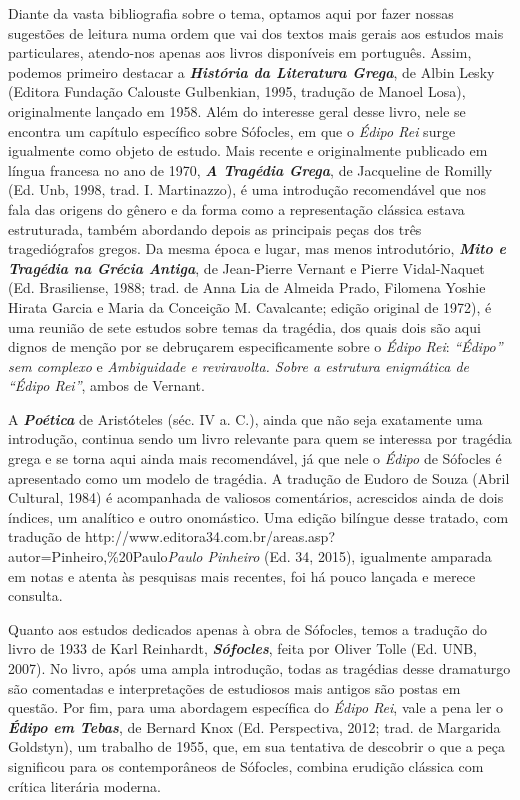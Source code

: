 Diante da vasta bibliografia sobre o tema, optamos aqui por fazer nossas
sugestões de leitura numa ordem que vai dos textos mais gerais aos
estudos mais particulares, atendo-nos apenas aos livros disponíveis em
português. Assim, podemos primeiro destacar a \emph{\textbf{História da
Literatura Grega}}, de Albin Lesky (Editora Fundação Calouste
Gulbenkian, 1995, tradução de Manoel Losa), originalmente lançado em
1958. Além do interesse geral desse livro, nele se encontra um capítulo
específico sobre Sófocles, em que o \emph{Édipo Rei} surge igualmente
como objeto de estudo. Mais recente e originalmente publicado em língua
francesa no ano de 1970, \emph{\textbf{A Tragédia Grega}}, de Jacqueline
de Romilly (Ed. Unb, 1998, trad. I. Martinazzo), é uma introdução
recomendável que nos fala das origens do gênero e da forma como a
representação clássica estava estruturada, também abordando depois as
principais peças dos três tragediógrafos gregos. Da mesma época e lugar,
mas menos introdutório, \emph{\textbf{Mito e Tragédia na Grécia
Antiga}}, de Jean-Pierre Vernant e Pierre Vidal-Naquet (Ed. Brasiliense,
1988; trad. de Anna Lia de Almeida Prado, Filomena Yoshie Hirata Garcia
e Maria da Conceição M. Cavalcante; edição original de 1972), é uma
reunião de sete estudos sobre temas da tragédia, dos quais dois são aqui
dignos de menção por se debruçarem especificamente sobre o \emph{Édipo
Rei}: \emph{``Édipo'' sem complexo} e \emph{Ambiguidade e reviravolta.
Sobre a estrutura enigmática de ``Édipo Rei''}, ambos de Vernant.

A \emph{\textbf{Poética}} de Aristóteles (séc. IV a. C.), ainda que não
seja exatamente uma introdução, continua sendo um livro relevante para
quem se interessa por tragédia grega e se torna aqui ainda mais
recomendável, já que nele o \emph{Édipo} de Sófocles é apresentado como
um modelo de tragédia. A tradução de Eudoro de Souza (Abril Cultural,
1984) é acompanhada de valiosos comentários, acrescidos ainda de dois
índices, um analítico e outro onomástico. Uma edição bilíngue desse
tratado, com tradução
de {http://www.editora34.com.br/areas.asp?autor=Pinheiro,\%20Paulo}{\emph{Paulo
Pinheiro}} (Ed. 34, 2015), igualmente amparada em notas e atenta às
pesquisas mais recentes, foi há pouco lançada e merece consulta.

Quanto aos estudos dedicados apenas à obra de Sófocles, temos a tradução
do livro de 1933 de Karl Reinhardt, \emph{\textbf{Sófocles}}, feita por
Oliver Tolle (Ed. UNB, 2007). No livro, após uma ampla introdução, todas
as tragédias desse dramaturgo são comentadas e interpretações de
estudiosos mais antigos são postas em questão. Por fim, para uma
abordagem específica do \emph{Édipo Rei}, vale a pena ler o
\emph{\textbf{Édipo em Tebas}}, de Bernard Knox (Ed. Perspectiva, 2012;
trad. de Margarida Goldstyn), um trabalho de 1955, que, em sua tentativa
de descobrir o que a peça significou para os contemporâneos de Sófocles,
combina erudição clássica com crítica literária moderna.

